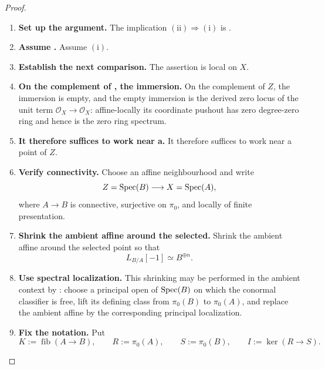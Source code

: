 \begin{proof}
\leavevmode
\begin{enumerate}[label=\textup{(\arabic*)}]
    \item \textbf{Set up the argument.}
    The implication \((\mathrm{ii})\Rightarrow(\mathrm{i})\) is .

    \item \textbf{Assume .}
    Assume \((\mathrm{i})\).

    \item \textbf{Establish the next comparison.}
    The assertion is local on \(X\).

    \item \textbf{On the complement of , the immersion.}
    On the complement of \(Z\), the immersion is empty, and the empty immersion is the
    derived zero locus of the unit term \(\mathcal O_X\to\mathcal O_X\): affine-locally its coordinate pushout has
    zero degree-zero ring and hence is the zero ring spectrum.

    \item \textbf{It therefore suffices to work near a.}
    It therefore suffices to work near a point of \(Z\).

    \item \textbf{Verify connectivity.}
    Choose an affine neighbourhood and write
    \[
            Z=\operatorname{Spec}(B)\longrightarrow X=\operatorname{Spec}(A),
        \]
    where \(A\to B\) is connective, surjective on \(\pi_0\), and locally of finite
    presentation.

    \item \textbf{Shrink the ambient affine around the selected.}
    Shrink the ambient affine around the selected point so that
    \[
            L_{B/A}[-1]\simeq B^{\oplus n}.
        \]

    \item \textbf{Use spectral localization.}
    This shrinking may be performed in the ambient context by
    : choose a principal open of \(\operatorname{Spec}(B)\) on
    which the conormal classifier is free, lift its defining class from \(\pi_0(B)\) to
    \(\pi_0(A)\), and replace the ambient affine by the corresponding principal localization.

    \item \textbf{Fix the notation.}
    Put
    \[
            K:=\operatorname{fib}(A\to B),
            \qquad
            R:=\pi_0(A),
            \qquad
            S:=\pi_0(B),
            \qquad
            I:=\ker(R\to S).
        \]


\end{enumerate}
\end{proof}
